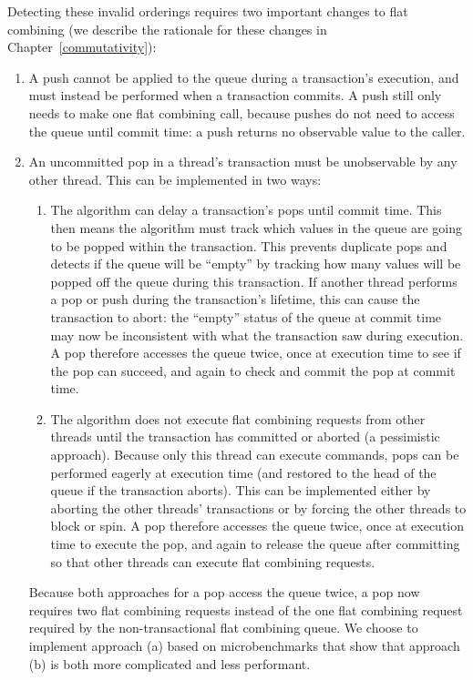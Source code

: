 Detecting these invalid orderings requires two important changes to flat combining (we describe the rationale for these changes in Chapter~\ref{commutativity}): 
\begin{enumerate}
    \item A push cannot be applied to the queue during a transaction's execution, and must instead be performed when a transaction commits. A push still only needs to make one flat combining call, because pushes do not need to access the queue until commit time: a push returns no observable value to the caller.
\item An uncommitted pop in a thread's transaction must be unobservable by any other thread. This can be implemented in two ways:  
    \begin{enumerate}
        \item The algorithm can delay a transaction's pops until commit time. This then means the algorithm must track which values in the queue are going to be popped within the transaction. This prevents duplicate pops and detects if the queue will be ``empty'' by tracking how many values will be popped off the queue during this transaction. If another thread performs a pop or push during the transaction's lifetime, this can cause the transaction to abort: the ``empty'' status of the queue at commit time may now be inconsistent with what the transaction saw during execution. 
        A pop therefore accesses the queue twice, once at execution time to see if the pop can succeed, and again to check and commit the pop at commit time. 
        \item The algorithm does not execute flat combining requests from other threads until the transaction has committed or aborted (a pessimistic approach). Because only this thread can execute commands, pops can be performed eagerly at execution time (and restored to the head of the queue if the transaction aborts). This can be implemented either by aborting the other threads' transactions or by forcing the other threads to block or spin.
        A pop therefore accesses the queue twice, once at execution time to execute the pop, and again to release the queue after committing so that other threads can execute flat combining requests.
    \end{enumerate}

        Because both approaches for a pop access the queue twice, a pop now requires two flat combining requests instead of the one flat combining request required by the non-transactional flat combining queue.
        We choose to implement approach (a) based on microbenchmarks that show that approach (b) is both more complicated and less performant.

\end{enumerate}


